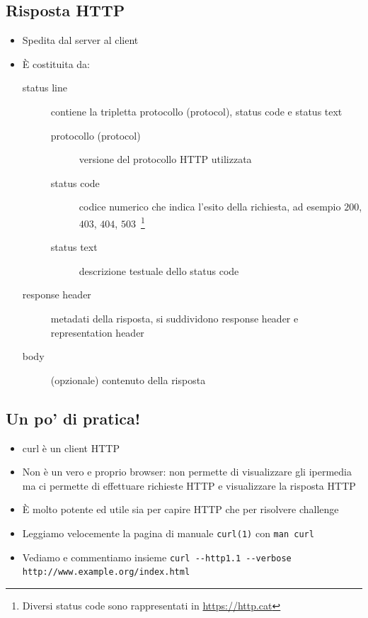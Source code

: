 \documentclass{beamer}
\newcommand{\code}[1]{\mbox{\texttt{#1}}}
\newcommand{\command}[1]{\mbox{\texttt{#1}}}
\begin{document}
\subsection*{Risposta HTTP}
\begin{frame}[allowframebreaks]{\insertsection}{\insertsubsection}
\begin{itemize}
\item Spedita dal \alert{server} al \alert{client}
\item È costituita da:
\begin{description}
\item[status line] contiene la tripletta \alert{protocollo (protocol)},
\alert{status code} e \alert{status text}
\begin{description}
\item[protocollo (protocol)] versione del protocollo HTTP utilizzata
\item[status code] codice numerico che indica l'esito della richiesta, ad
esempio $200$, $403$, $404$, $503$~\footnote{Diversi status code sono
rappresentati in \url{https://http.cat}}
\item[status text] descrizione testuale dello status code
\end{description}
\item[response header] metadati della risposta, si suddividono \alert{response
header} e \alert{representation header}
\item[body] (opzionale) contenuto della risposta
\end{description}
\end{itemize}
\end{frame}

\subsection*{Un po' di pratica!}
\begin{frame}[fragile]{\insertsection}{\insertsubsection}
\begin{itemize}
\item \alert{curl} è un client \alert{HTTP}
\item Non è un vero e proprio browser: non permette di visualizzare gli
ipermedia ma ci permette di effettuare richieste HTTP e visualizzare la
risposta HTTP
\item È molto potente ed utile sia per capire HTTP che per risolvere challenge
\item Leggiamo velocemente la pagina di manuale \code{curl(1)} con
\command{man curl}
\item Vediamo e commentiamo insieme
\small{\verb+curl --http1.1 --verbose http://www.example.org/index.html+}
\end{itemize}
\end{frame}
\end{document}
